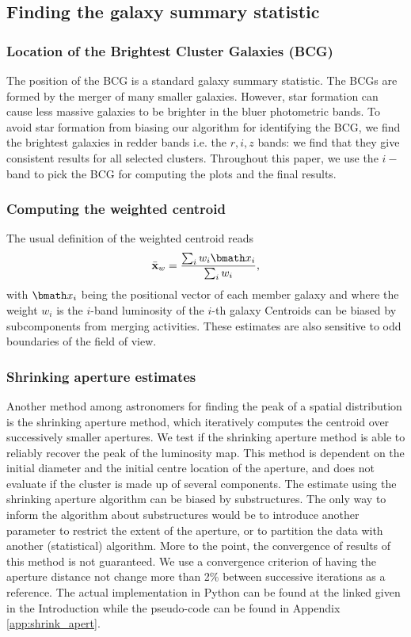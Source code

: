 \documentclass[usenatbib]{mn2e}
\renewcommand{\vec}[1]{ {\bmath #1} }
\begin{document}
{\subsection{Finding the galaxy summary statistic}
\label{subsec:methods:galaxy}

\subsubsection{Location of the Brightest Cluster Galaxies (BCG)}
The position of the BCG is a standard galaxy summary statistic.
The BCGs are formed by the merger of many smaller
galaxies. However, star formation can cause
less massive galaxies to be brighter in the bluer photometric bands.
To avoid star formation from biasing our algorithm for identifying the
BCG, we find the brightest galaxies in redder bands i.e. the $r, i, z$
bands: we find that they give consistent results for all selected clusters. 
Throughout this paper, we use the $i-$band to pick the BCG for computing the plots and the final results. 
 

\subsubsection{Computing the weighted centroid}
\label{subsubsec:weighted_centroid}
The usual definition of the weighted centroid reads
\begin{equation}
	\bar{\bf x}_w = \frac{\sum_i w_i \vec{x}_i}{\sum_i w_i},
\end{equation}
with $\vec{x}_i$ being the positional vector of each member galaxy 
and where the weight $w_i$ is the $i$-band luminosity of the $i$-th galaxy
Centroids can be biased by subcomponents from merging activities. 
These estimates are also sensitive to odd boundaries 
of the field of view.


\subsubsection{Shrinking aperture estimates}

Another method among astronomers for finding the peak of a spatial
distribution is the shrinking aperture method, which iteratively
computes the centroid over successively smaller apertures.
We test if the shrinking aperture method is able to reliably recover the 
peak of the luminosity map.
This method is dependent on the initial diameter and the initial centre 
location of the aperture, and 
 does not evaluate if the cluster is made up of
several components.
The estimate using the shrinking aperture algorithm can be biased by
substructures. The only way to inform the algorithm about substructures would
be to introduce another parameter to restrict the extent of the aperture, or to
partition the data with another (statistical) algorithm.
More to the point, the convergence of results of this method is not guaranteed. We use a
convergence criterion of having the aperture distance not change more than 2\% 
between successive iterations as a reference. The actual implementation in
{\sc Python} can be found at the linked given in the Introduction
while
the pseudo-code can be found in Appendix \ref{app:shrink_apert}.


}
\end{document}
